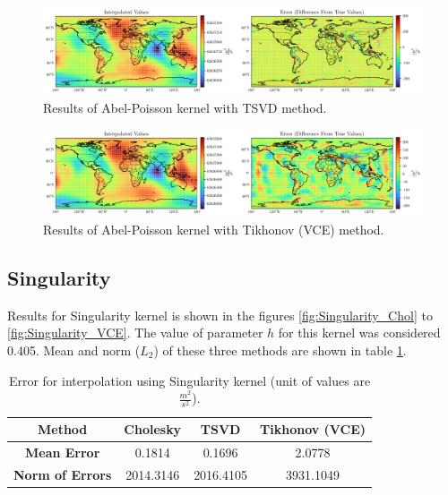 \documentclass[12pt]{article}
\begin{document}
	\begin{figure}[h!]
		\centering
		\includegraphics[width=16cm]{../Outputs/AbelPoisson_TSVD.pdf}
		\caption{Results of Abel-Poisson kernel with TSVD method.}
		\label{fig:AbelPoisson_TSVD}
	\end{figure}
	
	\begin{figure}[h!]
		\centering
		\includegraphics[width=16cm]{../Outputs/AbelPoisson_VCE.pdf}
		\caption{Results of Abel-Poisson kernel with Tikhonov (VCE) method.}
		\label{fig:AbelPoisson_VCE}
	\end{figure}
	
	
	
	\subsection{Singularity}
	
	Results for Singularity kernel is shown in the figures \ref{fig:Singularity_Chol} to \ref{fig:Singularity_VCE}. The value of parameter $h$ for this kernel was considered 0.405. Mean and norm ($L_2$) of these three methods are shown in table \ref{tab:Singularity_Error}.
	
	\begin{table}[h!]
		\centering
		\caption{Error for interpolation using Singularity kernel (unit of values are $\frac{m^2}{s^2}$).}
		\vspace{0.3cm}
		\renewcommand{\arraystretch}{1.4}
		\begin{tabular}{c|c|c|c}
			\textbf{Method} & Cholesky & TSVD & Tikhonov (VCE) \\
			\hline 
			\textbf{Mean Error} & 0.1814 & 0.1696 & 2.0778 \\
			\hline 
			\textbf{Norm of Errors} & 2014.3146 & 2016.4105 & 3931.1049 \\
		\end{tabular}
		\label{tab:Singularity_Error}
	\end{table}
	
\end{document}
